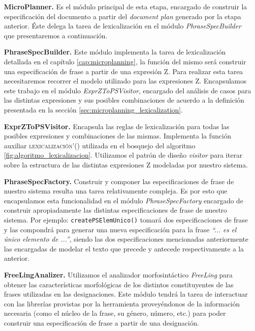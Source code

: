 \bigskip
\noindent
\textbf{MicroPlanner.} Es el módulo principal de esta etapa, encargado de construir la especificación del documento a partir del \textit{document plan} generado por la etapa anterior. Éste delega la tarea de lexicalización en el módulo \textit{PhraseSpecBuilder} que presentaremos a continuación.

\bigskip
\noindent
\textbf{PhraseSpecBuilder.} Este módulo implementa la tarea de lexicalización detallada en el capítulo \ref{cap:microplanning}, la función del mismo será construir una especificación de frase a partir de una expresión Z. Para realizar esta tarea necesitaremos recorrer el modelo utilizado para las expresiones Z. Encapsulamos este trabajo en el módulo \textit{ExprZToPSVisitor}, encargado del análisis de casos para las distintas expresiones y sus posibles combinaciones de acuerdo a la definición presentada en la sección \ref{sec:microplanning_lexicalization}.

\bigskip
\noindent
\textbf{ExprZToPSVisitor.} Encapsula las reglas de lexicalización para todas las posibles expresiones y combinaciones de las mismas. Implementa la función auxiliar \textsc{lexicalización'()} utilizada en el bosquejo del algoritmo \ref{fig:algoritmo_lexicalizacion}. Utilizamos el patrón de diseño \textit{visitor} \cite{gof} para iterar sobre la estructura de las distintas expresiones Z modeladas por nuestro sistema.

\bigskip
\noindent
\textbf{PhraseSpecFactory.} Construir y componer las especificaciones de frase de nuestro sistema resulta una tarea relativamente compleja. Es por esto que encapsulamos esta funcionalidad en el módulo \textit{PhraseSpecFactory} encargado de construir apropiadamente las distintas especificaciones de frase de nuestro sistema. Por ejemplo: \texttt{createPSElemUnico()} tomará dos especificaciones de frase y las compondrá para generar una nueva especificación para la frase \textit{``... es el único elemento de ...''}, siendo las dos especificaciones mencionadas anteriormente las encargadas de modelar el texto que precede y antecede respectivamente a la anterior.

\bigskip
\noindent
\textbf{FreeLingAnalizer.} Utilizamos el analizador morfosintáctico \textit{FreeLing} para obtener las características morfológicas de los distintos constituyentes de las frases utilizadas en las designaciones. Este módulo tendrá la tarea de interactuar con las librerías provistas por la herramienta proveyéndonos de la información necesaria (como el núcleo de la frase, su género, número, etc.) para poder construir una especificación de frase a partir de una designación.

